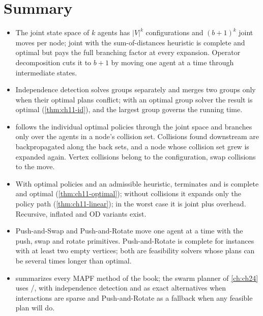 \section{Summary}
\begin{summary}
\begin{itemize}
  \item The joint state space of $k$ agents has $|V|^k$ configurations and
        $(b+1)^k$ joint moves per node; joint \astar with the sum-of-distances
        heuristic is complete and optimal but pays the full branching factor
        at every expansion. Operator decomposition cuts it to $b+1$ by moving
        one agent at a time through intermediate states.
  \item Independence detection solves groups separately and merges two
        groups only when their optimal plans conflict; with an optimal group
        solver the result is optimal (\cref{thm:ch11-id}), and the largest
        group governs the running time.
  \item \mstar follows the individual optimal policies through the joint
        space and branches only over the agents in a node's collision set.
        Collisions found downstream are backpropagated along the back sets,
        and a node whose collision set grew is expanded again. Vertex
        collisions belong to the configuration, swap collisions to the move.
  \item With optimal policies and an admissible heuristic, \mstar
        terminates and is complete and optimal (\cref{thm:ch11-optimal});
        without collisions it expands only the policy path
        (\cref{thm:ch11-linear}); in the worst case it is joint \astar plus
        overhead. Recursive, inflated and OD variants exist.
  \item Push-and-Swap and Push-and-Rotate move one agent at a time with the
        push, swap and rotate primitives. Push-and-Rotate is complete for
        instances with at least two empty vertices; both are feasibility
        solvers whose plans can be several times longer than optimal.
  \item {} summarizes every MAPF method of the book;
        the swarm planner of \cref{ch:ch24} uses \cbs/\ecbs, with
        independence detection and \mstar as exact alternatives when
        interactions are sparse and Push-and-Rotate as a fallback when any
        feasible plan will do.
\end{itemize}
\end{summary}

